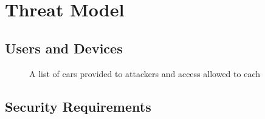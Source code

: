 \section{Threat Model}
\label{sec:threat-model}

\subsection{Users and Devices}





\iflong
\begin{figure}[H]
	\begin{center}
	\end{center}
	\caption{A list of cars provided to attackers and access allowed to each}
	\label{fig:cars}
\end{figure}
\fi

\subsection{Security Requirements}
\label{sec:SR}


